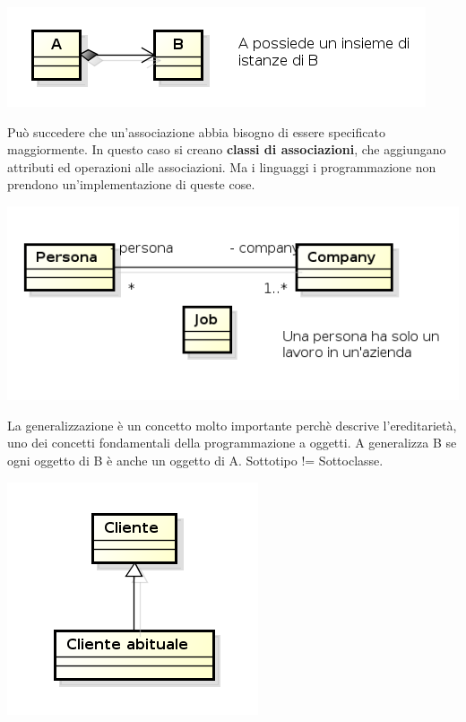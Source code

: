\begin{center}

\includegraphics[width=0.75\columnwidth]{img13} %

\end{center}

Può succedere che un'associazione abbia bisogno di essere specificato maggiormente. In questo caso si creano \textbf{classi di associazioni}, che aggiungano attributi ed operazioni alle associazioni. Ma i linguaggi i programmazione non prendono un'implementazione di queste cose.

\begin{center}

\includegraphics[width=0.75\columnwidth]{img14} %

\end{center}

La generalizzazione è un concetto molto importante perchè descrive l'ereditarietà, uno dei concetti fondamentali della programmazione a oggetti. A generalizza B se ogni oggetto di B è anche un oggetto di A. Sottotipo != Sottoclasse.

\begin{center}

\includegraphics[width=0.75\columnwidth]{img15} %

\end{center}

